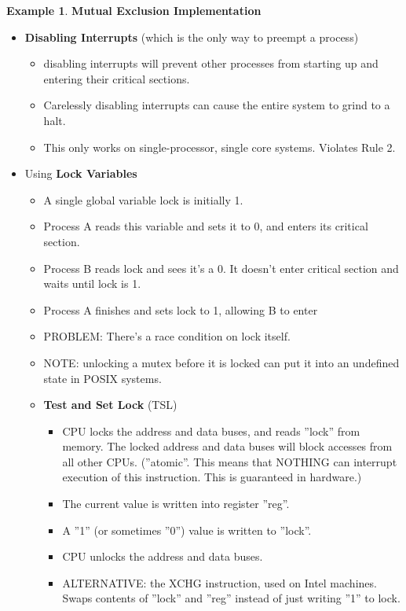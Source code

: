 \documentclass[12pt,a4paper]{article}
\theoremstyle{definition}
\newtheorem{example}{Example}[section]
\newenvironment{myitemize}
{ \begin{itemize}
    \setlength{\itemsep}{5pt}
    \setlength{\parskip}{0pt}
    \setlength{\parsep}{0pt}     }
{ \end{itemize}                  }
\begin{document}
\begin{example}{\textbf{Mutual Exclusion Implementation}}
	\begin{myitemize}
		\item \textbf{Disabling Interrupts} (which is the only way to preempt a process)
		\begin{myitemize}
			\item disabling interrupts will prevent other processes from starting up and entering their critical sections.
			\item Carelessly disabling interrupts can cause the entire system to grind to a halt.
			\item This only works on single-processor, single core systems. Violates Rule 2.
		\end{myitemize}
		\item Using \textbf{Lock Variables}
		\begin{myitemize}
			\item A single global variable \textsf{lock} is initially 1.
			\item Process A reads this variable and sets it to 0, and enters its critical section.
			\item Process B reads \textsf{lock} and sees it’s a 0. It doesn’t enter critical section and waits until \textsf{lock} is 1.
			\item Process A finishes and sets \textsf{lock} to 1, allowing B to enter
			\item PROBLEM: There’s a race condition on \textsf{lock}  itself.
			\item NOTE: unlocking a mutex before it is locked can put it into an undefined state in POSIX systems.
			\item \textbf{Test and Set Lock} (\textsf{TSL})
			\begin{myitemize}
				\item CPU locks the address and data buses, and reads ''lock'' from memory. The locked address and data buses will block accesses from all other CPUs. (''atomic''. This means that NOTHING can interrupt execution of this instruction. This is guaranteed in hardware.)
				\item The current value is written into register ''reg''.
				\item A ''1'' (or sometimes ''0'') value is written to ''lock''.
				\item CPU unlocks the address and data buses.
				\item ALTERNATIVE: the XCHG instruction, used on Intel machines. Swaps contents of ''lock'' and ''reg'' instead of just writing ''1'' to lock.

\end{myitemize}
\end{myitemize}
\end{myitemize}
\end{example}
\end{document}
